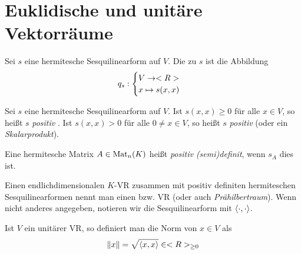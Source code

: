 \section{Euklidische und unitäre Vektorräume}

\begin{definition}
	Sei $s$ eine hermitesche Sesquilinearform auf $V$. Die  zu $s$ ist die Abbildung
	\begin{align}
		q_s:\begin{cases}
		V\to <R> \\ x\mapsto s(x,x)
		\end{cases}\notag
	\end{align}
\end{definition}

\begin{definition}
	Sei $s$ eine hermitesche Sesquilinearform auf $V$. Ist $s(x,x)\ge 0$ für alle $x\in V$, so heißt $s$ \emph{positiv} . Ist $s(x,x)>0$ für alle $0\neq x\in V$, so heißt $s$ \emph{positiv}  (oder ein \emph{Skalarprodukt}).
	
	Eine hermitesche Matrix $A\in\operatorname{Mat}_n(K)$ heißt \emph{positiv (semi)definit}, wenn $s_A$ dies ist.
	
	Einen endlichdimensionalen $K$-VR zusammen mit positiv definiten hermiteschen Sesquilinearformen nennt man einen  bzw.  VR (oder auch \emph{Prähilbertraum}). Wenn nicht anderes angegeben, notieren wir die Sesquilinearform mit $\left\langle \cdot,\cdot\right\rangle$.
\end{definition}

\begin{definition}
	Ist $V$ ein unitärer VR, so definiert man die Norm von $x\in V$ als
	\begin{align}
		\Vert x\Vert = \sqrt{\left\langle x,x\right\rangle}\in<R>_{\ge 0}\notag
	\end{align}
\end{definition}